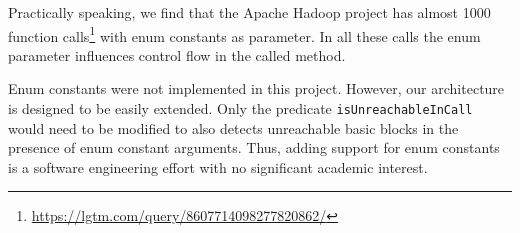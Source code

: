 Practically speaking, we find that the Apache Hadoop project has almost 1000
function calls\footnote{\url{https://lgtm.com/query/8607714098277820862/}} with 
enum constants as parameter.
In all these calls the enum parameter influences control flow in the called method.

Enum constants were not implemented in this project.
However, our architecture is designed to be easily extended.
Only the predicate \texttt{isUnreachableInCall} would need to be modified 
to also detects unreachable basic blocks in the presence of enum constant arguments.
Thus, adding support for enum constants is a software engineering effort
with no significant academic interest.
